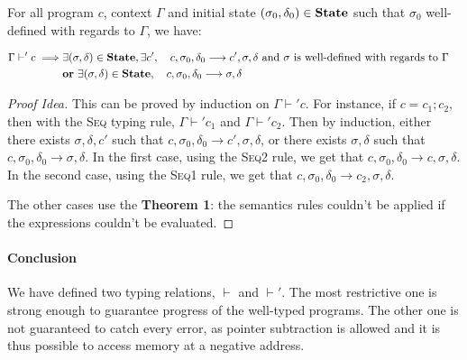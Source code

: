 \begin{thm}[Progress]
For all program $c$, context $\Gamma$ and initial state $(\sigma_0, \delta_0) \in \mathbf{State}{}$ such that $\sigma_0$ well-defined with regards to $\Gamma$, we have:

\begin{align*}
  \Gamma \vdash' c \implies & \exists (\sigma, \delta) \in \mathbf{State}{}, \exists c', \quad c, \sigma_0, \delta_0 \longrightarrow c',\sigma, \delta \text{ and $\sigma$ is well-defined with regards to $\Gamma$\quad} \\
  & \textbf{or}~ \exists (\sigma, \delta) \in \mathbf{State}{}, \quad c, \sigma_0, \delta_0 \longrightarrow \sigma, \delta
\end{align*}

\end{thm}

\begin{proof}[Proof Idea]
  This can be proved by induction on $\Gamma \vdash' c$. For instance, if $c=c_1;c_2$, then with the \textsc{Seq} typing rule, $\Gamma\vdash' c_1$ and $\Gamma\vdash' c_2$.
  Then by induction, either there exists $\sigma,\delta,c'$ such that $c,\sigma_0,\delta_0\longrightarrow c',\sigma,\delta$, or there exists $\sigma,\delta$ such that $c,\sigma_0,\delta_0\longrightarrow \sigma,\delta$.
  In the first case, using the \textsc{Seq2} rule, we get that $c,\sigma_0,\delta_0\longrightarrow c,\sigma,\delta$.
  In the second case, using the \textsc{Seq1} rule, we get that $c,\sigma_0,\delta_0\longrightarrow c_2,\sigma,\delta$.

  The other cases use the \textbf{Theorem 1}: the semantics rules couldn't be applied if the expressions couldn't be evaluated.

\end{proof}

\paragraph{Conclusion}
We have defined two typing relations, $\vdash$ and $\vdash'$. The most restrictive one is strong enough to guarantee progress of the well-typed programs. The other one is not guaranteed to catch every error, as pointer subtraction is allowed and it is thus possible to access memory at a negative address.
